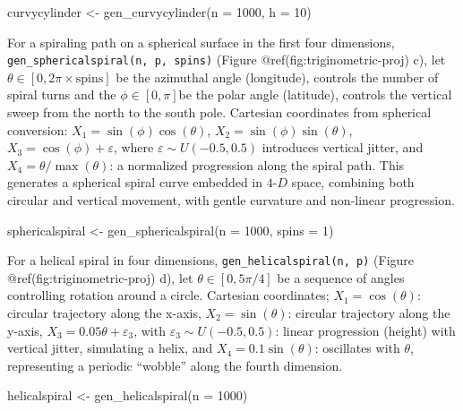 \documentclass[
  11pt,
  a4paper,
]{report}
\newenvironment{Shaded}{\begin{snugshade}}{\end{snugshade}}
\newcommand{\AttributeTok}[1]{\textcolor[rgb]{0.40,0.45,0.13}{#1}}
\newcommand{\DecValTok}[1]{\textcolor[rgb]{0.68,0.00,0.00}{#1}}
\newcommand{\FunctionTok}[1]{\textcolor[rgb]{0.28,0.35,0.67}{#1}}
\newcommand{\NormalTok}[1]{\textcolor[rgb]{0.00,0.23,0.31}{#1}}
\newcommand{\OtherTok}[1]{\textcolor[rgb]{0.00,0.23,0.31}{#1}}
\begin{document}
\begin{Shaded}
\begin{Highlighting}[]
\NormalTok{curvycylinder }\OtherTok{\textless{}{-}} \FunctionTok{gen\_curvycylinder}\NormalTok{(}\AttributeTok{n =} \DecValTok{1000}\NormalTok{, }\AttributeTok{h =} \DecValTok{10}\NormalTok{)}
\end{Highlighting}
\end{Shaded}

For a spiraling path on a spherical surface in the first four
dimensions, \texttt{gen\_sphericalspiral(n,\ p,\ spins)} (Figure
@ref(fig:triginometric-proj) c), let
\(\theta \in [0, 2\pi \times \text{spins}]\) be the azimuthal angle
(longitude), controls the number of spiral turns and the
\(\phi \in [0, \pi]\)be the polar angle (latitude), controls the
vertical sweep from the north to the south pole. Cartesian coordinates
from spherical conversion: \(X_1 = \sin(\phi)\cos(\theta)\),
\(X_2 = \sin(\phi)\sin(\theta)\), \(X_3 = \cos(\phi) + \varepsilon\),
where \(\varepsilon \sim U(-0.5, 0.5)\) introduces vertical jitter, and
\(X_4 = \theta / \max(\theta)\): a normalized progression along the
spiral path. This generates a spherical spiral curve embedded in
\(4\text{-}D\) space, combining both circular and vertical movement,
with gentle curvature and non-linear progression.

\begin{Shaded}
\begin{Highlighting}[]
\NormalTok{sphericalspiral }\OtherTok{\textless{}{-}} \FunctionTok{gen\_sphericalspiral}\NormalTok{(}\AttributeTok{n =} \DecValTok{1000}\NormalTok{, }\AttributeTok{spins =} \DecValTok{1}\NormalTok{)}
\end{Highlighting}
\end{Shaded}

For a helical spiral in four dimensions,
\texttt{gen\_helicalspiral(n,\ p)} (Figure @ref(fig:triginometric-proj)
d), let \(\theta \in [0, 5\pi/4]\) be a sequence of angles controlling
rotation around a circle. Cartesian coordinates; \(X_1 = \cos(\theta)\):
circular trajectory along the x-axis, \(X_2 = \sin(\theta)\): circular
trajectory along the y-axis, \(X_3 = 0.05\theta + \varepsilon_3\), with
\(\varepsilon_3 \sim U(-0.5, 0.5)\): linear progression (height) with
vertical jitter, simulating a helix, and \(X_4 = 0.1\sin(\theta)\):
oscillates with \(\theta\), representing a periodic ``wobble'' along the
fourth dimension.

\begin{Shaded}
\begin{Highlighting}[]
\NormalTok{helicalspiral }\OtherTok{\textless{}{-}} \FunctionTok{gen\_helicalspiral}\NormalTok{(}\AttributeTok{n =} \DecValTok{1000}\NormalTok{)}
\end{Highlighting}
\end{Shaded}
\end{document}
